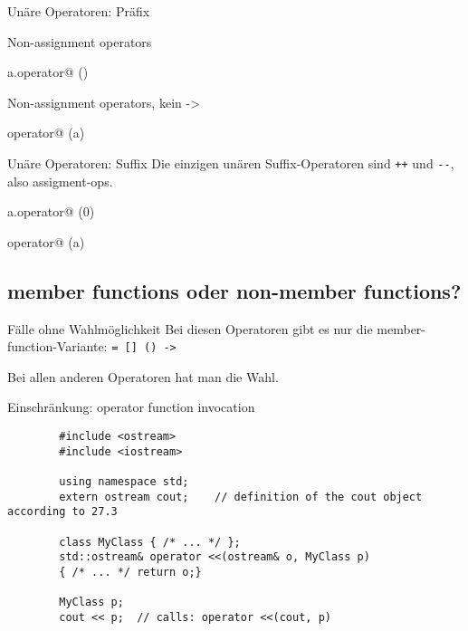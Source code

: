 \begin{frame}{Unäre Operatoren: Präfix}
	\onslide*<+>
	{
		Non-assignment operators
		
		\begin{block}{a.operator@ ()}
			
		\end{block}
	}
	
	\onslide*<+>
	{
		Non-assignment operators, kein -\textgreater
		
		\begin{block}{operator@ (a)}
			
		\end{block}
	}
\end{frame}

\begin{frame}[fragile]{Unäre Operatoren: Suffix}
	Die einzigen unären Suffix-Operatoren sind \verb!++! und \verb!--!, also assigment-ops.
	
	\onslide*<+>
	{
		\begin{block}{a.operator@ (0)}
			
		\end{block}
	}
	
	\onslide*<+>
	{
		\begin{block}{operator@ (a)}
			
		\end{block}
	}
\end{frame}




\subsection{member functions oder non-member functions?}

\begin{frame}[fragile]{Fälle ohne Wahlmöglichkeit}
	Bei diesen Operatoren gibt es nur die member-function-Variante: \verb!= [] () ->!
	
	\pause
	\vspace{1em}
	
	Bei allen anderen Operatoren hat man die Wahl.
	
	Einschränkung: operator function invocation
	\begin{lstlisting}
		#include <ostream>
		#include <iostream>
		
		using namespace std;
		extern ostream cout;	// definition of the cout object according to 27.3
		
		class MyClass { /* ... */ };
		std::ostream& operator <<(ostream& o, MyClass p)
		{ /* ... */ return o;}
		
		MyClass p;
		cout << p;	// calls: operator <<(cout, p)
	\end{lstlisting}
\end{frame}

